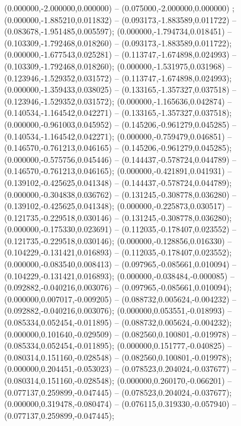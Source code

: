  (0.000000,-2.000000,0.000000) -- (0.075000,-2.000000,0.000000) ;
 (0.000000,-1.885210,0.011832) -- (0.093173,-1.883589,0.011722) -- (0.083678,-1.951485,0.005597);
 (0.000000,-1.794734,0.018451) -- (0.103309,-1.792468,0.018260) -- (0.093173,-1.883589,0.011722);
 (0.000000,-1.677543,0.025281) -- (0.113747,-1.674898,0.024993) -- (0.103309,-1.792468,0.018260);
 (0.000000,-1.531975,0.031968) -- (0.123946,-1.529352,0.031572) -- (0.113747,-1.674898,0.024993);
 (0.000000,-1.359433,0.038025) -- (0.133165,-1.357327,0.037518) -- (0.123946,-1.529352,0.031572);
 (0.000000,-1.165636,0.042874) -- (0.140534,-1.164542,0.042271) -- (0.133165,-1.357327,0.037518);
 (0.000000,-0.961003,0.045952) -- (0.145206,-0.961279,0.045285) -- (0.140534,-1.164542,0.042271);
 (0.000000,-0.759479,0.046851) -- (0.146570,-0.761213,0.046165) -- (0.145206,-0.961279,0.045285);
 (0.000000,-0.575756,0.045446) -- (0.144437,-0.578724,0.044789) -- (0.146570,-0.761213,0.046165);
 (0.000000,-0.421891,0.041931) -- (0.139102,-0.425625,0.041348) -- (0.144437,-0.578724,0.044789);
 (0.000000,-0.304838,0.036762) -- (0.131245,-0.308778,0.036280) -- (0.139102,-0.425625,0.041348);
 (0.000000,-0.225873,0.030517) -- (0.121735,-0.229518,0.030146) -- (0.131245,-0.308778,0.036280);
 (0.000000,-0.175330,0.023691) -- (0.112035,-0.178407,0.023552) -- (0.121735,-0.229518,0.030146);
 (0.000000,-0.128856,0.016330) -- (0.104229,-0.131421,0.016893) -- (0.112035,-0.178407,0.023552);
 (0.000000,-0.083540,0.008413) -- (0.097965,-0.085661,0.010094) -- (0.104229,-0.131421,0.016893);
 (0.000000,-0.038484,-0.000085) -- (0.092882,-0.040216,0.003076) -- (0.097965,-0.085661,0.010094);
 (0.000000,0.007017,-0.009205) -- (0.088732,0.005624,-0.004232) -- (0.092882,-0.040216,0.003076);
 (0.000000,0.053551,-0.018993) -- (0.085334,0.052454,-0.011895) -- (0.088732,0.005624,-0.004232);
 (0.000000,0.101640,-0.029509) -- (0.082560,0.100801,-0.019978) -- (0.085334,0.052454,-0.011895);
 (0.000000,0.151777,-0.040825) -- (0.080314,0.151160,-0.028548) -- (0.082560,0.100801,-0.019978);
 (0.000000,0.204451,-0.053023) -- (0.078523,0.204024,-0.037677) -- (0.080314,0.151160,-0.028548);
 (0.000000,0.260170,-0.066201) -- (0.077137,0.259899,-0.047445) -- (0.078523,0.204024,-0.037677);
 (0.000000,0.319478,-0.080474) -- (0.076115,0.319330,-0.057940) -- (0.077137,0.259899,-0.047445);
